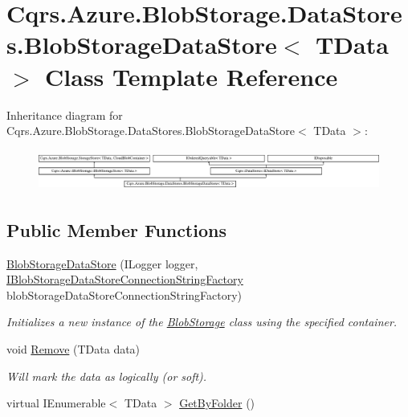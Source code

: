 \hypertarget{classCqrs_1_1Azure_1_1BlobStorage_1_1DataStores_1_1BlobStorageDataStore}{}\section{Cqrs.\+Azure.\+Blob\+Storage.\+Data\+Stores.\+Blob\+Storage\+Data\+Store$<$ T\+Data $>$ Class Template Reference}
\label{classCqrs_1_1Azure_1_1BlobStorage_1_1DataStores_1_1BlobStorageDataStore}
Inheritance diagram for Cqrs.\+Azure.\+Blob\+Storage.\+Data\+Stores.\+Blob\+Storage\+Data\+Store$<$ T\+Data $>$\+:\begin{figure}[H]
\begin{center}
\leavevmode
\includegraphics[height=1.352657cm]{classCqrs_1_1Azure_1_1BlobStorage_1_1DataStores_1_1BlobStorageDataStore}
\end{center}
\end{figure}
\subsection*{Public Member Functions}
\begin{DoxyCompactItemize}
\item 
\hyperlink{classCqrs_1_1Azure_1_1BlobStorage_1_1DataStores_1_1BlobStorageDataStore_aacea885f6a1d38921b99feb898fc33c2_aacea885f6a1d38921b99feb898fc33c2}{Blob\+Storage\+Data\+Store} (I\+Logger logger, \hyperlink{interfaceCqrs_1_1Azure_1_1BlobStorage_1_1DataStores_1_1IBlobStorageDataStoreConnectionStringFactory}{I\+Blob\+Storage\+Data\+Store\+Connection\+String\+Factory} blob\+Storage\+Data\+Store\+Connection\+String\+Factory)
\begin{DoxyCompactList}\small\item\em Initializes a new instance of the \hyperlink{namespaceCqrs_1_1Azure_1_1BlobStorage}{Blob\+Storage} class using the specified container. \end{DoxyCompactList}\item 
void \hyperlink{classCqrs_1_1Azure_1_1BlobStorage_1_1DataStores_1_1BlobStorageDataStore_af054d4134671d66981c4d91df5c1d481_af054d4134671d66981c4d91df5c1d481}{Remove} (T\+Data data)
\begin{DoxyCompactList}\small\item\em Will mark the {\itshape data}  as logically (or soft). \end{DoxyCompactList}\item 
virtual I\+Enumerable$<$ T\+Data $>$ \hyperlink{classCqrs_1_1Azure_1_1BlobStorage_1_1DataStores_1_1BlobStorageDataStore_a611a374a549ef987d0ff59bd84ea1a4b_a611a374a549ef987d0ff59bd84ea1a4b}{Get\+By\+Folder} ()
\end{DoxyCompactItemize}
